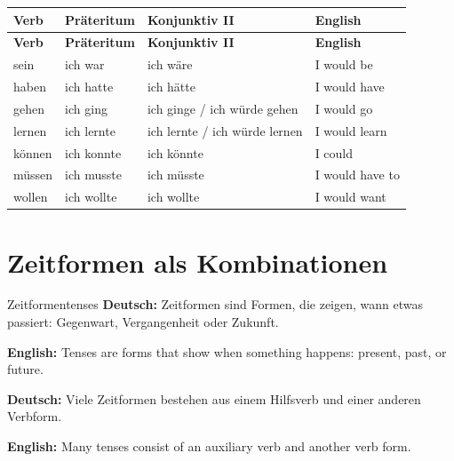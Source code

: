 \documentclass[a4paper,11pt]{article}
\newcommand{\GermanText}[1]{\textbf{Deutsch: }#1\par}
\newcommand{\EnglishText}[1]{{\small\color{SoftGray}\textbf{English: }#1\par}}
\begin{document}
\begin{longtable}{L{3cm}L{4cm}L{4cm}L{4cm}}
\color{white}\textbf{Verb} & \color{white}\textbf{Präteritum} & \color{white}\textbf{Konjunktiv II} & \color{white}\textbf{English} \\
\endfirsthead
{}
\color{white}\textbf{Verb} & \color{white}\textbf{Präteritum} & \color{white}\textbf{Konjunktiv II} & \color{white}\textbf{English} \\
\endhead
sein & ich war & ich wäre & I would be \\
haben & ich hatte & ich hätte & I would have \\
gehen & ich ging & ich ginge / ich würde gehen & I would go \\
lernen & ich lernte & ich lernte / ich würde lernen & I would learn \\
können & ich konnte & ich könnte & I could \\
müssen & ich musste & ich müsste & I would have to \\
wollen & ich wollte & ich wollte & I would want \\
\end{longtable}

\section{Zeitformen als Kombinationen}

\begin{grammarentry}{Zeitformen}{tenses}
\GermanText{Zeitformen sind Formen, die zeigen, wann etwas passiert: Gegenwart, Vergangenheit oder Zukunft.}
\EnglishText{Tenses are forms that show when something happens: present, past, or future.}
\GermanText{Viele Zeitformen bestehen aus einem Hilfsverb und einer anderen Verbform.}
\EnglishText{Many tenses consist of an auxiliary verb and another verb form.}
\end{grammarentry}
\end{document}
